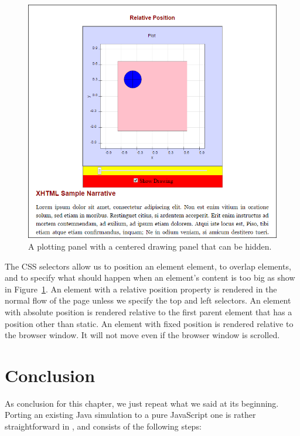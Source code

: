 \begin{figure}[htb]
  \centering
  \includegraphics[scale=\scale]{04JavatoJS/images/RelativePosition.png}
  \caption{A plotting panel with a centered drawing panel that can be hidden.}
  \label{fig:04JavatoJS/RelativePosition}
\end{figure}

The CSS selectors allow us to position an element element, to overlap elements, and to specify what should happen when an element's content is too big as show in Figure~\ref{fig:04JavatoJS/RelativePosition}. An element with a relative position property is rendered in the normal flow of the page  unless we specify the top and left selectors. An element with absolute position is rendered relative to the first parent element that has a position other than static. An element with fixed position is rendered relative to the browser window.  It will not move even if the browser window is scrolled.

    \section{Conclusion}\label{section:04Conclusion}

As conclusion for this chapter, we just repeat what we said at its beginning. Porting an existing Java simulation to a pure JavaScript one is rather straightforward in \ejs, and consists of the following steps:

